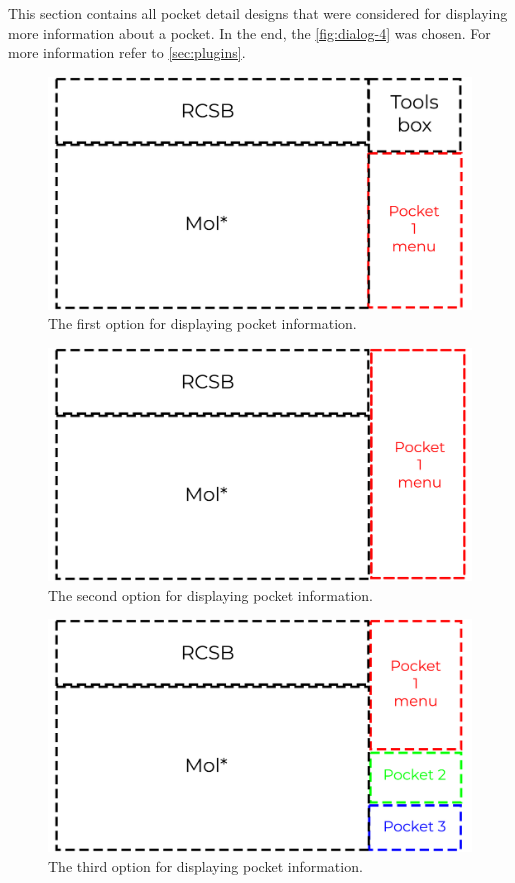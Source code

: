 This section contains all pocket detail designs that were considered for displaying more information about a pocket. In the end, the \cref{fig:dialog-4} was chosen. For more information refer to \cref{sec:plugins}.

\begin{figure}
    \centering
    \includegraphics[width=1\linewidth]{img/dialog_1-svg.pdf}
    \caption{The first option for displaying pocket information.}
    \label{fig:figure-1}
\end{figure}

\begin{figure}
    \centering
    \includegraphics[width=1\linewidth]{img/dialog_2-svg.pdf}
    \caption{The second option for displaying pocket information.}
    \label{fig:figure-2}
\end{figure}

\begin{figure}
	\centering
	\includegraphics[width=1\linewidth]{img/dialog_3-svg.pdf}
	\caption{The third option for displaying pocket information.}
	\label{fig:figure-3}
\end{figure}

